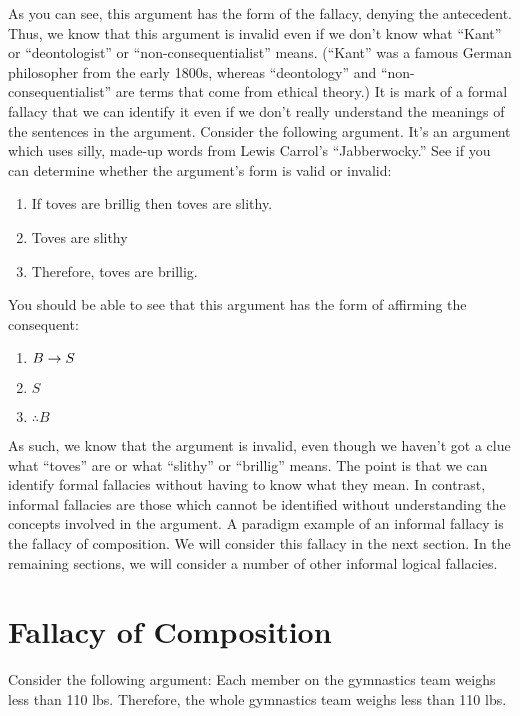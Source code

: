 As you can see, this argument has the form of the fallacy, denying the antecedent. Thus, we know that this argument is invalid even if we don't know what ``Kant'' or ``deontologist'' or ``non-consequentialist'' means. (``Kant'' was a famous German philosopher from the early 1800s, whereas ``deontology'' and
``non-consequentialist'' are terms that come from ethical theory.) It is mark of a formal fallacy that we can identify it even if we don't really understand the meanings of the sentences in the argument. Consider the following argument. It's an argument which uses silly, made-up words from Lewis Carrol's ``Jabberwocky.'' See if you can determine whether the argument's form is valid or invalid:

\begin{enumerate}
\item If toves are brillig then toves are slithy.
\item Toves are slithy
\item Therefore, toves are brillig.
\end{enumerate}

You should be able to see that this argument has the form of affirming the
consequent:
\begin{enumerate}
\item $B \mathrel{\rightarrow} S$
\item $S$
\item $\therefore B$
\end{enumerate}

As such, we know that the argument is invalid, even though we haven't got a clue what ``toves'' are or what ``slithy'' or ``brillig'' means. The point is that we can identify formal fallacies without having to know what they mean. In contrast, informal fallacies are those which cannot be identified without understanding the concepts involved in the argument. A paradigm example of an informal fallacy is the fallacy of composition. We will consider this fallacy in the next section. In the remaining sections, we will consider a number of other informal logical fallacies.

\section{Fallacy of Composition}

Consider the following argument:
Each member on the gymnastics team weighs less than 110 lbs.
Therefore, the whole gymnastics team weighs less than 110 lbs.

